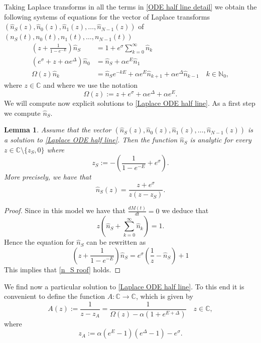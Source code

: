 \documentclass{article}
\numberwithin{equation}{section}
\theoremstyle{plain}
\newtheorem{lemma}[theorem]{Lemma}
\begin{document}
Taking Laplace transforms in all the terms in \eqref{ODE half line detail} we obtain the following systems of equations for the vector of Laplace transforms $(\hat{n}_S (z), \hat{n}_0(z), \hat{n}_1(z), \dots, \hat{n}_{N-1}(z) )$ of $(n_S(t), n_0(t), n_1(t), \dots,n_{N-1} (t))$
\begin{align}\label{Laplace ODE half line}
  \left( z + \frac{1}{1-e^{- E}} \right)   \hat{ n}_S  &= 1+ e^{\sigma }  \sum_{k=0}^{\infty} \hat{n}_k  \nonumber \\
\left(   e^{\sigma } +z + \alpha e^{\Delta} \right) \hat {n}_0 &=  \hat{ n}_S  + \alpha e^E  \hat{ n}_1  \\
\Omega (z) \hat {n}_k &= \hat{n}_S e^{- k E} + \alpha e^E \hat{n}_{k+1}  + \alpha e^{\Delta} \hat{n}_{k-1} \quad k \in \mathbb N_0 \nonumber ,
\end{align}
where $ z \in \mathbb C$ and where we use the notation 
\begin{equation}\label{Omega}
\Omega (z):= z+ e^{\sigma }  + \alpha e^{\Delta} +  \alpha e^{E}. 
\end{equation}
We will compute now explicit solutions to \eqref{Laplace ODE half line}. As a first step we compute $\hat{n}_S$. 

\begin{lemma}
    Assume that the vector $(\hat{n}_S (z), \hat{n}_0(z), \hat{n}_1(z), \dots, \hat{n}_{N-1}(z) )$ is a solution to \eqref{Laplace ODE half line}. Then the function $\hat{n}_S $ is analytic for every $z \in \mathbb C \setminus \{ z_S, 0  \} $ where 
\begin{equation} \label{zS}
z_S := - \left(  \frac{1}{1-e^{- E}} + e^\sigma \right).
\end{equation}
More precisely, we have that
    \begin{equation}\label{n_S roof}
\hat{ n}_S(z) = \frac{z+ e^\sigma }{ z \left( z - z_S\right) }.
\end{equation}
\end{lemma}
\begin{proof}
Since in this model we have that $\frac{d M(t)}{dt}  =0$ we deduce that 
\[ 
z \left( \hat{n}_S + \sum_{k=0}^{\infty} \hat{n}_k   \right) =1.
\]
Hence the equation for $\hat{n}_S $ can be rewritten as 
\[
  \left( z + \frac{1}{1-e^{- E}} \right)   \hat{ n}_S  =  e^{\sigma }  \left( \frac{1}{z} -  \hat{ n}_S \right) +1 
\]
This implies that \eqref{n_S roof} holds.
\end{proof}


We find now a particular solution to \eqref{Laplace ODE half line}. 
To this end it is convenient to define the function $A: \mathbb C \rightarrow \mathbb C $, which is given by 
\begin{equation}\label{A}
A (z) := \frac{1}{z-z_A}=\frac{1}{\Omega (z) - \alpha \left( 1+e^{E+ \Delta} \right) } \quad z \in \mathbb C, 
\end{equation}
where 
\begin{equation}\label{pole of A}
z_A := \alpha (e^{E} -1 ) (e^{\Delta } -1 )- e^\sigma. 
\end{equation}
\end{document}
